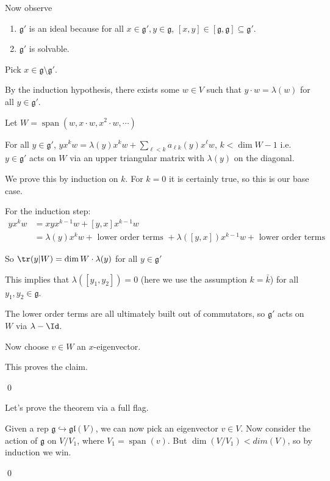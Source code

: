 \documentclass[x11names,reqno,14pt]{extarticle}
\newcommand{\mk}[1]{\mathfrak{#1}}
\newcommand{\g}{\mk{g}}
\newcommand{\bark}{\bar{k}}
\newcommand{\into}{\hookrightarrow}
\newcommand{\gl}{\mk{g}\mk{l}}
\DeclareMathOperator{\Span}{span}
\begin{document}
Now observe 
\begin{enumerate}[label=(\alph*)]

\item $\g'$ is an ideal because for all $x \in \g', y \in \g$, $[x, y] \in [\g,\g]\subseteq\g'$. 

\item $\g'$ is solvable.

\end{enumerate}

Pick $x \in \g\setminus\g'$. 

By the induction hypothesis, there exists some $w \in V$ such that $y\cdot w = \lambda(w)$ for all $y \in \g'$. 

Let $W = \Span(w, x\cdot w, x^2\cdot w, \cdots)$

\claim

For all $y \in \g'$, $yx^kw = \lambda(y)x^kw + \sum_{\ell<k}a_{\ell k}(y)x^\ell w$, $k < \dim W - 1$ i.e. $y \in \g'$ acts on $W$ via an upper triangular matrix with $\lambda(y)$ on the diagonal. 

\proof

We prove this by induction on $k$. For $k = 0$ it is certainly true, so this is our base case.

For the induction step: 
\begin{align*}
yx^kw & = xyx^{k-1}w + [y,x]x^{k-1}w \\
& = \lambda(y)x^kw + \text{ lower order terms } + \lambda([y,x])x^{k-1}w + \text{ lower order terms }
\end{align*}

So $\tr(y|W) = \dim W \cdot \lambda(y)$ for all $y \in \g'$

This implies that $\lambda([y_1,y_2]) = 0$ (here we use the assumption $k = \bark$) for all $y_1,y_2\in\g$.

The lower order terms are all ultimately built out of commutators, so $\g'$ acts on $W$ via $\lambda-\Id$. 

Now choose $v \in W$ an $x$-eigenvector. 

This proves the claim. 

\qed

Let's prove the theorem via a full flag. 

Given a rep $\g\into\gl(V)$, we can now pick an eigenvector $v \in V$. Now consider the action of $\g$ on $V/V_1$, where $V_1 = \Span(v)$. But $\dim(V/V_1) < dim(V)$, so by induction we win. 

\qed
\end{document}
